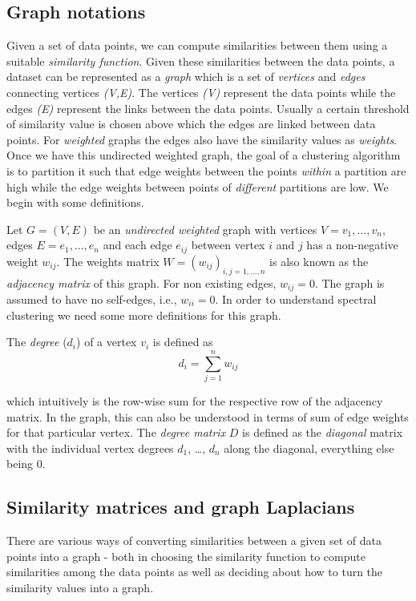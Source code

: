 \subsection{Graph notations}
Given a set of data points, we can compute similarities between them using a suitable \textit{similarity function}. Given these similarities between the data points, a dataset can be represented as a \textit{graph} which is a set of \textit{vertices} and \textit{edges} connecting vertices \textit{(V,E)}. The vertices \textit{(V)} represent the data points while the edges \textit{(E)} represent the links between the data points. Usually a certain threshold of similarity value is chosen above which the edges are linked between data points. For \textit{weighted} graphs the edges also have the similarity values as \textit{weights}. Once we have this undirected weighted graph, the goal of a clustering algorithm is to partition it such that edge weights between the points \textit{within} a partition are high while the edge weights between points of \textit{different} partitions are low. We begin with some definitions.

Let $G = (V,E)$ be an \textit{undirected weighted} graph with vertices $V = {v_{1},\dots,v_{n}}$, edges $E= {e_{1},\dots,e_{n}}$ and each edge $e_{ij}$ between vertex $i$ and $j$  has a non-negative weight $w_{ij}$. The weights matrix $W = (w_{ij})_{i,j=1,\dots,n}$ is also known as the \textit{adjacency matrix} of this graph. For non existing edges, $w_{ij}=0$. The graph is assumed to have no self-edges, i.e., $w_{ii}=0$. In order to understand spectral clustering we need some more definitions for this graph.

The \textit{degree} ($d_{i}$) of a vertex $v_{i}$ is defined as
\[
d_{i} = \sum_{j=1}^{n}w_{ij}
\]

which intuitively is the row-wise sum for the respective row of the adjacency matrix. In the graph, this can also be understood in terms of sum of edge weights for that particular vertex. The \textit{degree matrix} $D$ is defined as the \textit{diagonal} matrix with the individual vertex degrees $d_{1}$, \dots, $d_{n}$ along the diagonal, everything else being $0$.

\subsection{Similarity matrices and graph Laplacians}
There are various ways of converting similarities between a given set of data points into a graph - both in choosing the similarity function to compute similarities among the data points as well as deciding about how to turn the similarity values into a graph.

